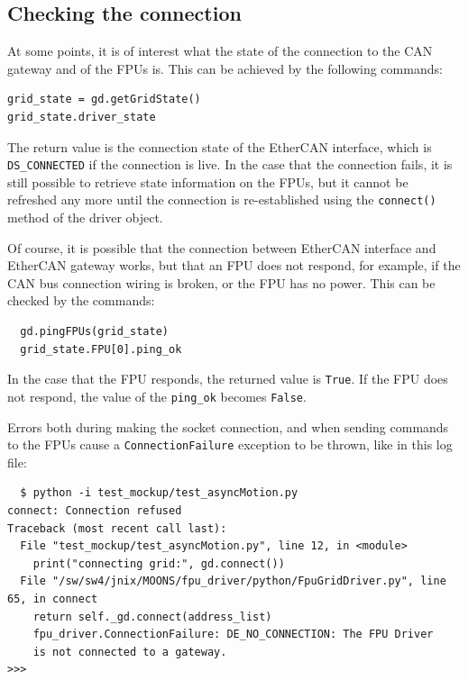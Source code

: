 \documentclass[11pt,a4paper]{scrartcl}
\begin{document}
\subsection{Checking the connection}
\begin{samepage}
At some points, it is of interest what the state of
the connection to the CAN gateway and of the FPUs is.
This can be achieved by the following commands:
\begin{verbatim}
grid_state = gd.getGridState()
grid_state.driver_state  
\end{verbatim}
The return value is the connection state of the EtherCAN interface, which is
\texttt{DS\_CONNECTED} if the connection is live.  In the case that the
connection fails, it is still possible to retrieve state information
on the FPUs, but it cannot be refreshed any more until the connection
is re-established using the \texttt{connect()} method of the driver
object.
\end{samepage}

 Of course, it is possible that the
connection between EtherCAN interface and EtherCAN gateway works, but that an FPU
does not respond, for example, if the CAN bus connection wiring is
broken, or the FPU has no power. This can be checked by the commands:

\begin{verbatim}
  gd.pingFPUs(grid_state)
  grid_state.FPU[0].ping_ok
\end{verbatim}

In the case that the FPU responds, the returned value is
\texttt{True}.  If the FPU does not respond, the value of the
\verb+ping_ok+ becomes \texttt{False}.

Errors both during making the socket connection, and when sending
commands to the FPUs cause a \texttt{ConnectionFailure} exception to
be thrown, like in this log file:

\begin{verbatim}
  $ python -i test_mockup/test_asyncMotion.py 
connect: Connection refused
Traceback (most recent call last):
  File "test_mockup/test_asyncMotion.py", line 12, in <module>
    print("connecting grid:", gd.connect())
  File "/sw/sw4/jnix/MOONS/fpu_driver/python/FpuGridDriver.py", line 65, in connect
    return self._gd.connect(address_list)
    fpu_driver.ConnectionFailure: DE_NO_CONNECTION: The FPU Driver
    is not connected to a gateway.
>>> 
\end{verbatim}
\end{document}
